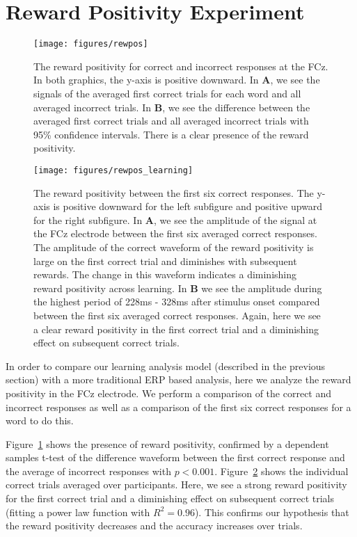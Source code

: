 \section{Reward Positivity Experiment}

\begin{figure}[t]
  \centerline{
    \texttt{[image: figures/rewpos]}
  }
  \caption[Reward Positivity for Correct and Incorrect Responses]{
    The reward positivity for correct and incorrect responses at the FCz. In 
    both graphics, the y-axis is positive downward. In {\bf A}, we see the 
    signals of the averaged first correct trials for each word and all averaged 
    incorrect trials. In {\bf B}, we see the difference between the averaged 
    first correct trials and all averaged incorrect trials with 95\% confidence 
    intervals.  There is a clear presence of the reward positivity.
  }
  \label{fig:rewpos}
\end{figure}

\begin{figure}[t]
  \centerline{
    \texttt{[image: figures/rewpos\_learning]}
  }
  \caption[Reward Positivity between the First Six Correct Responses]{
    The reward positivity between the first six correct responses. The y-axis 
    is positive downward for the left subfigure and positive upward for the 
    right subfigure. In {\bf A}, we see the amplitude of the signal at the FCz 
    electrode between the first six averaged correct responses. The amplitude 
    of the correct waveform of the reward positivity is large on the first 
    correct trial and diminishes with subsequent rewards. The change in this 
    waveform indicates a diminishing reward positivity across learning. In {\bf 
    B} we see the amplitude during the highest period of 228ms - 328ms after 
    stimulus onset compared between the first six averaged correct responses.  
    Again, here we see a clear reward positivity in the first correct trial and 
    a diminishing effect on subsequent correct trials.
  }
  \label{fig:rewpos_learning}
\end{figure}

In order to compare our learning analysis model (described in the previous 
section) with a more traditional ERP based analysis, here we analyze the reward 
positivity in the FCz electrode. We perform a comparison of the correct and 
incorrect responses as well as a comparison of the first six correct responses 
for a word to do this.

Figure~\ref{fig:rewpos} shows the presence of reward positivity, confirmed by a 
dependent samples t-test of the difference waveform between the first correct 
response and the average of incorrect responses with $p < 0.001$.  
Figure~\ref{fig:rewpos_learning} shows the individual correct trials averaged 
over participants. Here, we see a strong reward positivity for the first 
correct trial and a diminishing effect on subsequent correct trials (fitting a 
power law function with $R^2 = 0.96$). This confirms our hypothesis that the 
reward positivity decreases and the \tvt accuracy increases over trials.
